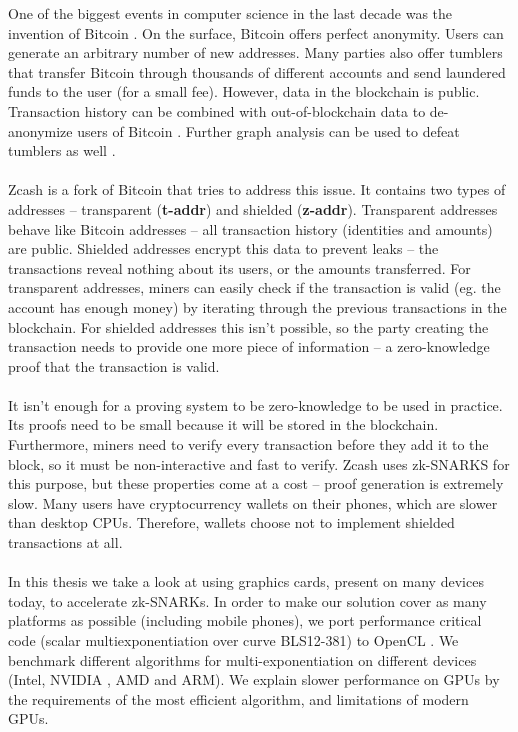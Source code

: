 One of the biggest events in computer science in the last decade was the invention of Bitcoin \cite{nakamoto2008bitcoin}. On the surface, Bitcoin offers perfect anonymity. Users can generate an arbitrary number of new addresses. Many parties also offer tumblers that transfer Bitcoin through thousands of different accounts and send laundered funds to the user (for a small fee). However, data in the blockchain is public. Transaction history can be combined with out-of-blockchain data to de-anonymize users of Bitcoin \cite{biryukov2014deanonymisation}. Further graph analysis can be used to defeat tumblers as well \cite{de2017analysis}.\\
\\
Zcash \cite{zcashprotocol} is a fork of Bitcoin that tries to address this issue. It contains two types of addresses -- transparent (\textbf{t-addr}) and shielded (\textbf{z-addr}). Transparent addresses behave like Bitcoin addresses -- all transaction history (identities and amounts) are public. Shielded addresses encrypt this data to prevent leaks -- the transactions reveal nothing about its users, or the amounts transferred. For transparent addresses, miners can easily check if the transaction is valid (eg. the account has enough money) by iterating through the previous transactions in the blockchain. For shielded addresses this isn't possible, so the party creating the transaction needs to provide one more piece of information -- a zero-knowledge proof that the transaction is valid. \\
\\
It isn't enough for a proving system to be zero-knowledge to be used in practice. Its proofs need to be small because it will be stored in the blockchain. Furthermore, miners need to verify every transaction before they add it to the block, so it must be non-interactive and fast to verify. Zcash uses zk-SNARKS for this purpose, but these properties come at a cost -- proof generation is extremely slow. Many users have cryptocurrency wallets on their phones, which are slower than desktop CPUs. Therefore, wallets choose not to implement shielded transactions at all.\\
\\
In this thesis we take a look at using graphics cards, present on many devices today, to accelerate zk-SNARKs. In order to make our solution cover as many platforms as possible (including mobile phones), we port performance critical code (scalar multiexponentiation over curve BLS12-381) to OpenCL \cite{stone2010opencl}. We benchmark different algorithms for multi-exponentiation on different devices (Intel, NVIDIA , AMD and ARM). We explain slower performance on GPUs by the requirements of the most efficient algorithm, and limitations of modern GPUs.\\
